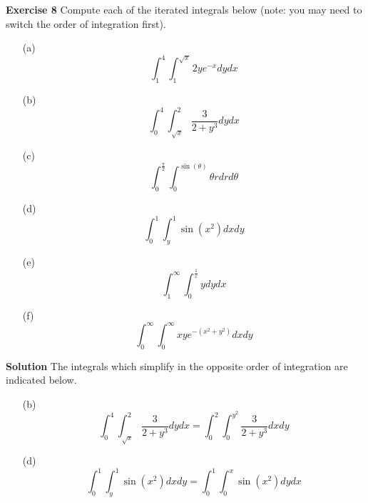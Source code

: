 \documentclass[12pt,oneside]{exam}
\newenvironment{exercise}[1]{\vspace{.1in}\noindent\textbf{Exercise #1 \hspace{.05em}}}{}
\newenvironment{newsolution}{\vspace{.1in}\noindent\textbf{Solution \hspace{.05em}}}{}
\begin{document}
\begin{exercise}{8}
Compute each of the iterated integrals below (note: you may need to switch the order of integration first). 
\begin{itemize}
\item[(a)] 
\begin{equation*}
\int_{1}^{4} \int_{1}^{\sqrt{x}} 2ye^{-x} dy dx
\end{equation*}
\item[(b)] 
\begin{equation*}
\int_{0}^{4} \int_{\sqrt{x}}^{2} \frac{3}{2+y^3}dy dx 
\end{equation*}
\item[(c)] 
\begin{equation*}
\int_{0}^{\frac{\pi}{2}} \int_{0}^{\sin(\theta)} \theta r dr d\theta
\end{equation*}
\item[(d)] 
\begin{equation*}
\int_{0}^{1} \int_{y}^{1} \sin(x^2) dx dy
\end{equation*}
\item[(e)] 
\begin{equation*}
\int_{1}^{\infty} \int_{0}^{\frac{1}{x}} y dy dx
\end{equation*}
\item[(f)] 
\begin{equation*}
\int_{0}^{\infty} \int_{0}^{\infty} xye^{-(x^2+y^2)} dx dy
\end{equation*}
\end{itemize}
\end{exercise}

\begin{newsolution}
The integrals which simplify in the opposite order of integration are indicated below. 
\begin{itemize}
\item[(b)] 
\begin{equation*}
\int_{0}^{4} \int_{\sqrt{x}}^{2} \frac{3}{2+y^3}dy dx  = \int_{0}^{2} \int_{0}^{y^2} \frac{3}{2+y^3} dx dy
\end{equation*}
\item[(d)] 
\begin{equation*}
\int_{0}^{1}\int_{y}^{1} \sin(x^2) dx dy = \int_{0}^{1} \int_{0}^{x} \sin(x^2) dy dx
\end{equation*}
\end{itemize}
\end{newsolution}
\end{document}
